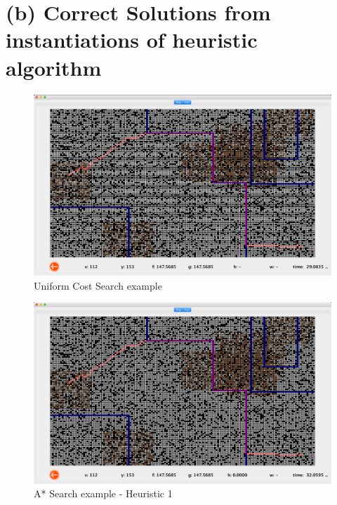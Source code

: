 \section{(b) Correct Solutions from instantiations of heuristic algorithm}

\begin{figure}[H]
	\centering
 	\includegraphics[scale = 0.25]{ucs_grid.png}
	\caption{Uniform Cost Search example}
	\label{fig: Uniform Cost Search Path Trace}
\end{figure}

\begin{figure}[H]
	\centering
  \includegraphics[scale = 0.25]{astar_grid.png}
	\caption{A* Search example - Heuristic 1}
	\label{fig: A* Search Path Trace H2}
\end{figure}

